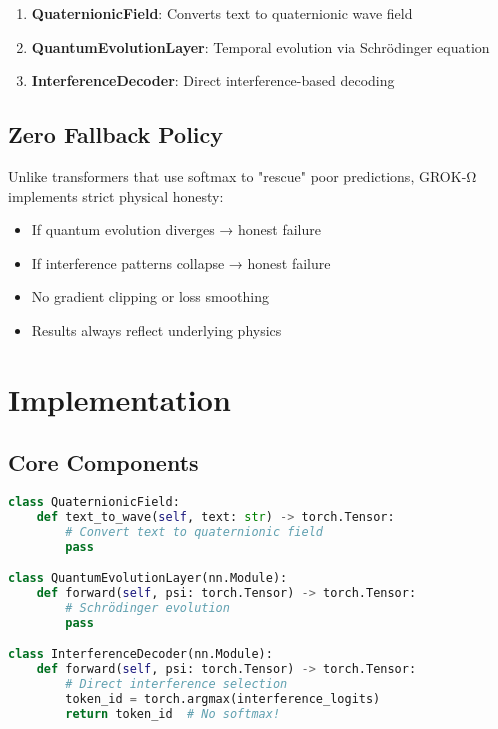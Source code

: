 \documentclass[11pt,a4paper]{article}
\begin{document}
\begin{enumerate}
\item \textbf{QuaternionicField}: Converts text to quaternionic wave field
\item \textbf{QuantumEvolutionLayer}: Temporal evolution via Schrödinger equation
\item \textbf{InterferenceDecoder}: Direct interference-based decoding
\end{enumerate}

\subsection{Zero Fallback Policy}

Unlike transformers that use softmax to "rescue" poor predictions, GROK-Ω implements strict physical honesty:
\begin{itemize}
\item If quantum evolution diverges → honest failure
\item If interference patterns collapse → honest failure
\item No gradient clipping or loss smoothing
\item Results always reflect underlying physics
\end{itemize}

\section{Implementation}

\subsection{Core Components}

\begin{lstlisting}[language=Python, caption=GROK-Ω Core Architecture]
class QuaternionicField:
    def text_to_wave(self, text: str) -> torch.Tensor:
        # Convert text to quaternionic field
        pass

class QuantumEvolutionLayer(nn.Module):
    def forward(self, psi: torch.Tensor) -> torch.Tensor:
        # Schrödinger evolution
        pass

class InterferenceDecoder(nn.Module):
    def forward(self, psi: torch.Tensor) -> torch.Tensor:
        # Direct interference selection
        token_id = torch.argmax(interference_logits)
        return token_id  # No softmax!
\end{lstlisting}
\end{document}
